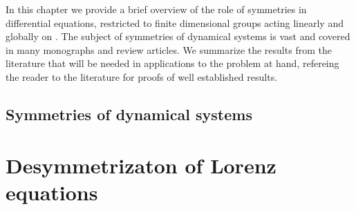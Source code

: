 
In this chapter we provide a brief overview of the role of
symmetries in differential equations, restricted to finite
dimensional groups acting linearly and globally on . The
subject of symmetries of dynamical systems is vast and covered
in many monographs and review articles. We summarize the
results from the literature that will be needed in applications
to the problem at hand, refereing the reader to the literature
for proofs of well established results.

 \section{Symmetries of dynamical systems}
        \label{sec:symIntro}
        



\chapter{Desymmetrizaton of Lorenz equations}
\label{chap:Lorenz}
    


